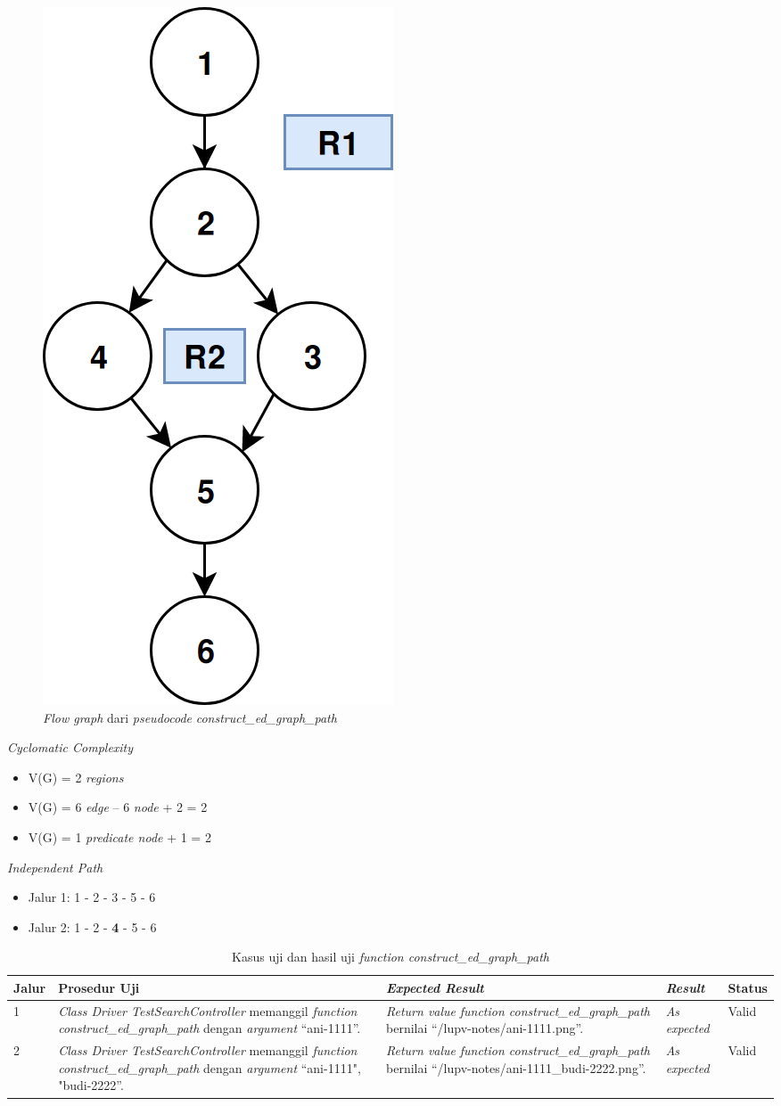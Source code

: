 \begin{figure}[H]
  \centering
  \includegraphics[width=.23\linewidth]{img/test-case/construct_ed_graph_path}
  \caption{\emph{Flow graph} dari \emph{pseudocode}
    \emph{construct\_ed\_graph\_path}}\label{fg:construct_ed_graph_path}
\end{figure}
\newpage %
\noindent
\emph{Cyclomatic Complexity}

\begin{itemize}
\item V(G) = 2 \emph{regions}
\item V(G) = 6 \emph{edge} – 6 \emph{node} + 2 = 2
\item V(G) = 1 \emph{predicate node} + 1 = 2
\end{itemize}

\noindent
\emph{Independent Path}

\begin{itemize}
\item Jalur 1: 1 - 2 - 3 - 5 - 6
\item Jalur 2: 1 - 2 - \textbf{4} - 5 - 6
\end{itemize}

\begin{longtable}{|P{.06\textwidth}|P{.30\textwidth}|P{.30\textwidth}|P{.10\textwidth}|P{.08\textwidth}|}
  \caption{Kasus uji dan hasil uji \emph{function construct\_ed\_graph\_path}} \label{jalur:construct_ed_graph_path}\\
  \hline
  \textbf{Jalur} & \textbf{Prosedur Uji} & \textbf{\emph{Expected Result}} & \textbf{\emph{Result}} & \textbf{Status} \\\hline
  1 & \emph{Class Driver TestSearchController} memanggil \emph{function construct\_ed\_graph\_path} dengan
      \emph{argument} ``ani-1111''. & \emph{Return value} \emph{function construct\_ed\_graph\_path} bernilai
                                     ``/lupv-notes/ani-1111.png''. & \emph{As expected} & Valid \\\hline
  2 & \emph{Class Driver TestSearchController} memanggil \emph{function construct\_ed\_graph\_path} dengan
      \emph{argument} ``ani-1111", "budi-2222''. & \emph{Return value} \emph{function
                                                   construct\_ed\_graph\_path} bernilai
                                                   ``/lupv-notes/ani-1111\_budi-2222.png''. & \emph{As expected} & Valid \\\hline
\end{longtable}

